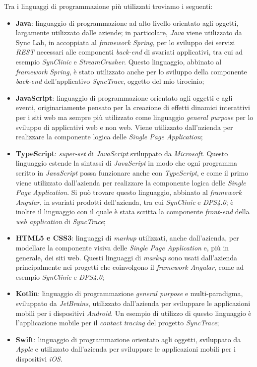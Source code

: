 Tra i linguaggi di programmazione più utilizzati troviamo i seguenti:
\begin{itemize}
  \item \textbf{Java}: linguaggio di programmazione ad alto livello orientato agli oggetti, largamente utilizzato dalle aziende; in particolare, \textit{Java} viene utilizzato da Sync Lab, in accoppiata al \textit{framework Spring}, per lo sviluppo dei servizi \textit{REST} necessari alle componenti \textit{back-end} di svariati applicativi, tra cui ad esempio \textit{SynClinic} e \textit{StreamCrusher}. Questo linguaggio, abbinato al \textit{framework Spring}, è stato utilizzato anche per lo sviluppo della componente \textit{back-end} dell'applicativo \textit{SyncTrace}, oggetto del mio tirocinio;

  \item \textbf{JavaScript}: linguaggio di programmazione orientato agli oggetti e agli eventi, originariamente pensato per la creazione di effetti dinamici interattivi per i siti web ma sempre più utilizzato come linguaggio \textit{general purpose} per lo sviluppo di applicativi web e non web. Viene utilizzato dall'azienda per realizzare la componente logica delle \textit{Single Page Application};

  \item \textbf{TypeScript}: \textit{super-set} di \textit{JavaScript} sviluppato da \textit{Microsoft}. Questo linguaggio estende la sintassi di \textit{JavaScript} in modo che ogni programma scritto in \textit{JavaScript} possa funzionare anche con \textit{TypeScript}, e come il primo viene utilizzato dall'azienda per realizzare la componente logica delle \textit{Single Page Application}. Si può trovare questo linguaggio, abbinato al \textit{framework Angular}, in svariati prodotti dell'azienda, tra cui \textit{SynClinic} e \textit{DPS4.0}; è inoltre il linguaggio con il quale è stata scritta la componente \textit{front-end} della \textit{web application} di \textit{SyncTrace};

  \item \textbf{HTML5 e CSS3}: linguaggi di \textit{markup} utilizzati, anche dall'azienda, per modellare la componente visiva delle \textit{Single Page Application} e, più in generale, dei siti web. Questi linguaggi di \textit{markup} sono usati dall'azienda principalmente nei progetti che coinvolgono il \textit{framework Angular}, come ad esempio \textit{SynClinic} e \textit{DPS4.0};

  \item \textbf{Kotlin}: linguaggio di programmazione \textit{general purpose} e multi-paradigma, sviluppato da \textit{JetBrains}, utilizzato dall'azienda per sviluppare le applicazioni mobili per i dispositivi \textit{Android}. Un esempio di utilizzo di questo linguaggio è l'applicazione mobile per il \textit{contact tracing} del progetto \textit{SyncTrace};

  \item \textbf{Swift}: linguaggio di programmazione orientato agli oggetti, sviluppato da \textit{Apple} e utilizzato dall'azienda per sviluppare le applicazioni mobili per i dispositivi \textit{iOS}.
\end{itemize}

